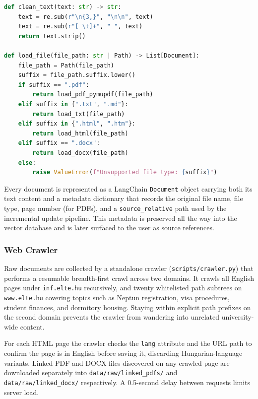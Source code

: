 \begin{lstlisting}[language=Python]
def clean_text(text: str) -> str:
    text = re.sub(r"\n{3,}", "\n\n", text)
    text = re.sub(r"[ \t]+", " ", text)
    return text.strip()

def load_file(file_path: str | Path) -> List[Document]:
    file_path = Path(file_path)
    suffix = file_path.suffix.lower()
    if suffix == ".pdf":
        return load_pdf_pymupdf(file_path)
    elif suffix in {".txt", ".md"}:
        return load_txt(file_path)
    elif suffix in {".html", ".htm"}:
        return load_html(file_path)
    elif suffix == ".docx":
        return load_docx(file_path)
    else:
        raise ValueError(f"Unsupported file type: {suffix}")
\end{lstlisting}

Every document is represented as a LangChain \texttt{Document} object carrying both its text content and a metadata dictionary that records the original file name, file type, page number (for PDFs), and a \texttt{source\_relative} path used by the incremental update pipeline. This metadata is preserved all the way into the vector database and is later surfaced to the user as source references.

\subsubsection{Web Crawler}

Raw documents are collected by a standalone crawler (\texttt{scripts/crawler.py}) that performs a resumable breadth-first crawl across two domains. It crawls all English pages under \texttt{inf.elte.hu} recursively, and twenty whitelisted path subtrees on \texttt{www.elte.hu} covering topics such as Neptun registration, visa procedures, student finances, and dormitory housing. Staying within explicit path prefixes on the second domain prevents the crawler from wandering into unrelated university-wide content.

For each HTML page the crawler checks the \texttt{lang} attribute and the URL path to confirm the page is in English before saving it, discarding Hungarian-language variants. Linked PDF and DOCX files discovered on any crawled page are downloaded separately into \texttt{data/raw/linked\_pdfs/} and \texttt{data/raw/linked\_docx/} respectively. A 0.5-second delay between requests limits server load.

